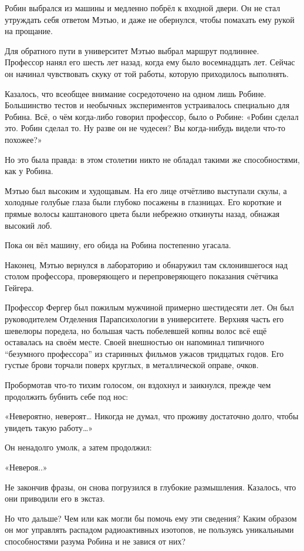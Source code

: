\documentclass[a5paper, 9pt,
final, openany, twoside=true]{memoir}
\begin{document}
Робин выбрался из машины и медленно побрёл к входной двери. Он не стал утруждать себя ответом Мэтью, и даже не обернулся, чтобы помахать ему рукой на прощание.\bigskip

Для обратного пути в университет Мэтью выбрал маршрут подлиннее. Профессор нанял его шесть лет назад, когда ему было восемнадцать лет. Сейчас он начинал чувствовать скуку от той работы, которую приходилось выполнять.

Казалось, что всеобщее внимание сосредоточено на одном лишь Робине. Большинство тестов и необычных экспериментов устраивалось специально для Робина. Всё, о чём когда-либо говорил профессор, было о Робине: «Робин сделал это. Робин сделал то. Ну разве он не чудесен? Вы когда-нибудь видели что-то похожее?»

Но это была правда: в этом столетии никто не обладал такими же способностями, как у Робина.\bigskip

Мэтью был высоким и худощавым. На его лице отчётливо выступали скулы, а холодные голубые глаза были глубоко посажены в глазницах. Его короткие и прямые волосы каштанового цвета были небрежно откинуты назад, обнажая высокий лоб.

Пока он вёл машину, его обида на Робина постепенно угасала.\bigskip

Наконец, Мэтью вернулся в лабораторию и обнаружил там склонившегося над столом профессора, проверяющего и перепроверяющего показания счётчика Гейгера.

Профессор Фергер был пожилым мужчиной примерно шестидесяти лет. Он был руководителем Отделения Парапсихологии в университете. Верхняя часть его шевелюры поредела, но большая часть побелевшей копны волос всё ещё оставалась на своём месте. Своей внешностью он напоминал типичного ``безумного профессора'' из старинных фильмов ужасов тридцатых годов. Его густые брови торчали поверх круглых, в металлической оправе, очков.

Пробормотав что-то тихим голосом, он вздохнул и заикнулся, прежде чем продолжить бубнить себе под нос:

«Невероятно, невероят… Никогда не думал, что проживу достаточно долго, чтобы увидеть такую работу…»

Он ненадолго умолк, а затем продолжил:

«Невероя..»

Не закончив фразы, он снова погрузился в глубокие размышления. Казалось, что они приводили его в экстаз.

Но что дальше? Чем или как могли бы помочь ему эти сведения? Каким образом он мог управлять распадом радиоактивных изотопов, не пользуясь уникальными способностями разума Робина и не завися от них?
\end{document}
